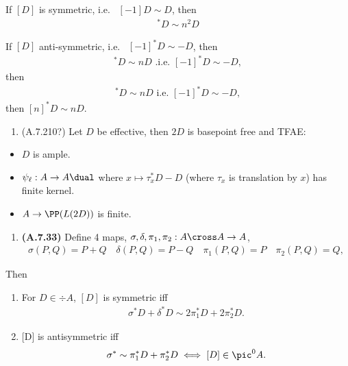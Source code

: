 If \([D]\) is symmetric, i.e.~ \([-1]D \sim D\), then
\begin{align*}
  [n]^* D \sim n^2 D
  \end{align*}

If \([D]\) anti-symmetric, i.e.~ \([-1]^* D \sim -D\), then
\begin{align*}
  [n]^*D \sim nD \text{ .i.e. } [-1]^* D \sim -D
  ,\end{align*} then
\begin{align*}
  [n]^*D \sim nD \text{ i.e. } [-1]^* D \sim -D
  ,\end{align*} then \([n]^*D \sim nD\).

\begin{enumerate}
\def\labelenumi{\arabic{enumi}.}
\setcounter{enumi}{1}
\tightlist
\item
  (A.7.210?) Let \(D\) be effective, then \(2D\) is basepoint free and
  TFAE:
\end{enumerate}

\begin{itemize}
\tightlist
\item
  \(D\) is ample.
\item
  \(\psi_\ell: A \to A\dual\) where \(x \mapsto \tau_x^*D - D\) (where
  \(\tau_x\) is translation by \(x\)) has finite kernel.
\item
  \(A \to \PP(L(2D))\) is finite.
\end{itemize}

\begin{enumerate}
\def\labelenumi{\arabic{enumi}.}
\setcounter{enumi}{2}
\tightlist
\item
  \textbf{(A.7.33)} Define 4 maps,
  \(\sigma, \delta, \pi_1, \pi_2: A\cross A \to A\), \begin{align*}
  \sigma(P, Q) = P + Q \quad \delta(P, Q) = P - Q \quad \pi_1(P, Q) = P \quad \pi_2(P, Q) = Q
  ,\end{align*}
\end{enumerate}

Then

\begin{enumerate}
\def\labelenumi{\alph{enumi}.}
\item
  For \(D\in \div A\), \([D]\) is symmetric iff
  \begin{align*}
    \sigma^* D + \delta^* D \sim 2\pi_1^* D + 2\pi_2^* D
    .\end{align*}
\item
  {[}D{]} is antisymmetric iff
  \begin{align*}
    \sigma^* \sim \pi_1^* D + \pi_2^* D \iff [D] \in \pic^0 A
    .\end{align*}
\end{enumerate}

